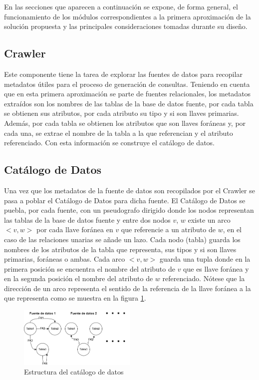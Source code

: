 En las secciones que aparecen a continuación se expone, de forma general, el funcionamiento de los módulos correspondientes a la primera 
aproximación de la solución propuesta y las principales consideraciones tomadas durante
su diseño.

\subsection{Crawler}

Este componente tiene la tarea de explorar las fuentes de datos para recopilar metadatos \'utiles para el proceso de generación
de consultas. Teniendo en cuenta que en esta primera aproximación se parte de fuentes relacionales, los metadatos extra\'idos son 
los nombres de las tablas de la base de datos fuente, por cada tabla se obtienen sus 
atributos, por cada atributo su tipo y si son llaves primarias. Además, por cada tabla se obtienen los atributos que son llaves 
for\'aneas y, por cada una, se extrae el nombre de la tabla a la que referencian y el atributo referenciado. Con esta información se construye 
el catálogo de datos.

\subsection{Catálogo de Datos}

Una vez que los metadatos de la fuente de datos son recopilados por el Crawler se pasa a poblar el Catálogo de Datos para dicha fuente. 
El Cat\'alogo de Datos se puebla, por cada fuente, 
con un pseudografo dirigido donde los nodos representan las tablas de la base de datos fuente y entre dos nodos $v$, $w$ 
existe un arco $<v,w>$ por cada llave for\'anea en $v$ que referencie a un atributo de $w$, en el caso de las relaciones unarias se añade un lazo. Cada nodo 
(tabla) guarda los nombres de los atributos de la tabla que representa, sus tipos y si son llaves primarias, for\'aneas o ambas. Cada arco $<v,w>$ 
guarda una tupla donde en la primera posición se encuentra el nombre del atributo de $v$ que es llave for\'anea y en la segunda 
posición el nombre del atributo de $w$ referenciado. Nótese que la dirección de un arco representa el sentido de la 
referencia de la llave for\'anea a la que representa como se muestra en la figura \ref{fig:datacatalogproposal}.

\begin{figure}[H]
    \centering
    \includegraphics[width=0.5\textwidth]{Graphics/data_catalog.drawio.png}
    \caption{Estructura del catálogo de datos}
    \label{fig:datacatalogproposal}
\end{figure}

